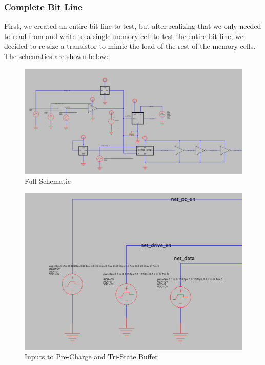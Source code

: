 \documentclass[a4paper]{article}
\begin{document}
\subsubsection{Complete Bit Line}
First, we created an entire bit line to test, but after realizing that we only needed to read from and write to a single memory cell to test the entire bit line, we decided to re-size a transistor to mimic the load of the rest of the memory cells. The schematics are shown below: 
\begin{figure}[H]
	\centering
	\includegraphics[scale=0.25]{exampleBitlineFull}
	\caption{Full Schematic}
	\label{fig:bitlineFull}
\end{figure}

\begin{figure}[H]
	\centering
	\includegraphics[scale=0.35]{exampleBitlineInputs}
	\caption{Inputs to Pre-Charge and Tri-State Buffer}
	\label{fig:bitlineInputs}
\end{figure}
\end{document}
